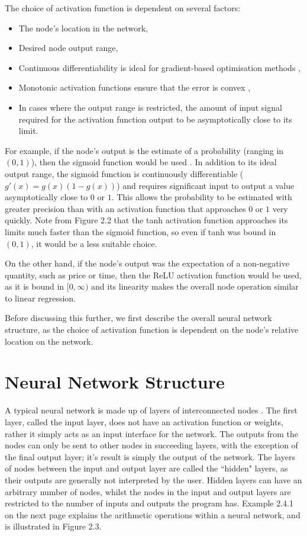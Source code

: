 \documentclass[honours,12pt]{unswthesis}
\numberwithin{equation}{section}
\theoremstyle{definition}
\begin{document}
\newpage
The choice of activation function is dependent on several factors:
\begin{itemize}
\item The node's location in the network,
\item Desired node output range,
\item Continuous differentiability is ideal for gradient-based optimisation methods \citep{snyman},
\item Monotonic activation functions ensure that the error is convex \citep{wu},
\item In cases where the output range is restricted, the amount of input signal required for the activation function output to be asymptotically close to its limit.
\end{itemize}

For example, if the node's output is the estimate of a probability (ranging in $(0,1)$), then the sigmoid function would be used \citep{cybenko}. In addition to its ideal output range, the sigmoid function is continuously differentiable ($g'(x)=g(x)(1-g(x))$) and requires significant input to output a value asymptotically close to $0$ or $1$. This allows the probability to be estimated with greater precision than with an activation function that approaches $0$ or $1$ very quickly. Note from Figure 2.2 that the tanh activation function approaches its limits much faster than the sigmoid function, so even if tanh was bound in $(0,1)$, it would be a less suitable choice.

On the other hand, if the node's output was the expectation of a non-negative quantity, such as price or time, then the ReLU activation function would be used, as it is bound in $[0,\infty)$ and its linearity makes the overall node operation similar to linear regression.

Before discussing this further, we first describe the overall neural network structure, as the choice of activation function is dependent on the node's relative location on the network.
\section{Neural Network Structure}
A typical neural network is made up of layers of interconnected nodes \citep{neuralstat}. The first layer, called the input layer, does not have an activation function or weights, rather it simply acts as an input interface for the network. The outputs from the nodes can only be sent to other nodes in succeeding layers, with the exception of the final output layer; it's result is simply the output of the network. The layers of nodes between the input and output layer are called the ``hidden" layers, as their outputs are generally not interpreted by the user. Hidden layers can have an arbitrary number of nodes, whilst the nodes in the input and output layers are restricted to the number of inputs and outputs the program has. Example 2.4.1 on the next page explains the arithmetic operations within a neural network, and is illustrated in Figure 2.3.
\end{document}
